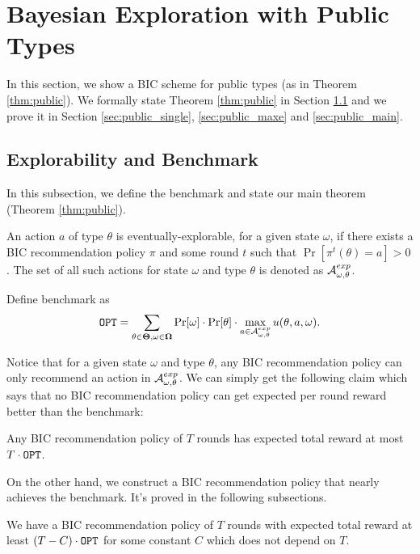 
\section{Bayesian Exploration with Public Types}
\label{sec:public}
In this section, we show a BIC scheme for public types (as in Theorem \ref{thm:public}). We formally state Theorem \ref{thm:public} in Section \ref{sec:public_bench} and we prove it in Section \ref{sec:public_single}, \ref{sec:public_maxe} and \ref{sec:public_main}.

\subsection{Explorability and Benchmark}
\label{sec:public_bench}
In this subsection, we define the benchmark and state our main theorem (Theorem \ref{thm:public}).

\begin{definition}
\label{def:public_exp}
An action $a$ of type $\theta$ is eventually-explorable, for a given state $\omega$, if there exists a BIC recommendation policy $\pi$ and some round $t$ such that $\Pr[\pi^t(\theta)= a]> 0$. The set of all such actions for state $\omega$ and type $\theta$ is denoted as $\mathcal{A}_{\omega,\theta}^{exp}$.
\end{definition}

\begin{definition}[Benchmark]
Define benchmark as
\[
\mathtt{OPT} = \sum_{\theta \in \bold{\Theta}, \omega\in \bold{\Omega}} \Pr[\omega] \cdot \Pr[\theta] \cdot \max_{a \in \mathcal{A}_{\omega,\theta}^{exp}} u(\theta, a, \omega).
\]
\end{definition}

Notice that for a given state $\omega$ and type $\theta$, any BIC recommendation policy can only recommend an action in $\mathcal{A}_{\omega,\theta}^{exp}$. We can simply get the following claim which says that no BIC recommendation policy can get expected per round reward better than the benchmark:
\begin{claim}
Any BIC recommendation policy of $T$ rounds has expected total reward at most $T \cdot\mathtt{OPT}$.
\end{claim}

On the other hand, we construct a BIC recommendation policy that nearly achieves the benchmark. It's proved in the following subsections.
\begin{theorem}
\label{thm:public}
We have a BIC recommendation policy of $T$ rounds with expected total reward at least $\left(T - C \right) \cdot \mathtt{OPT}$ for some constant $C$ which does not depend on $T$.
\end{theorem}

